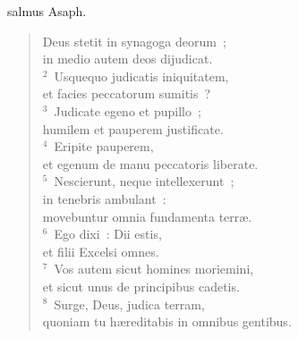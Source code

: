 \bchapter
{}salmus Asaph. \begin{flushleft}\begin{verse}\vspace{6pt}Deus stetit in synagoga deorum~;\\ in medio autem deos dijudicat.\\
${}^{2}$~Usquequo judicatis iniquitatem,\\ et facies peccatorum sumitis~?\\
${}^{3}$~Judicate egeno et pupillo~;\\ humilem et pauperem justificate.\\
${}^{4}$~Eripite pauperem,\\ et egenum de manu peccatoris liberate.\\
${}^{5}$~Nescierunt, neque intellexerunt~;\\ in tenebris ambulant~:\\ movebuntur omnia fundamenta terr\ae .\\
${}^{6}$~Ego dixi~: Dii estis,\\ et filii Excelsi omnes.\\
${}^{7}$~Vos autem sicut homines moriemini,\\ et sicut unus de principibus cadetis.\\
${}^{8}$~Surge, Deus, judica terram,\\ quoniam tu h\ae reditabis in omnibus gentibus.\end{verse}\end{flushleft}



